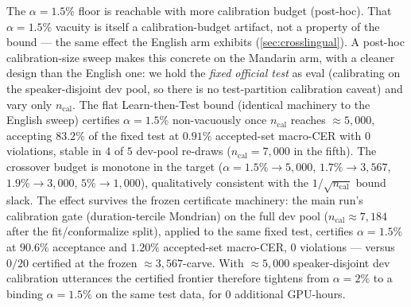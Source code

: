 \documentclass[11pt]{article}
\begin{document}
The $\alpha=1.5\%$ floor is reachable with more calibration budget (post-hoc).
That $\alpha=1.5\%$ vacuity is itself a calibration-budget artifact, not a property of
the bound --- the same effect the English arm exhibits (\cref{sec:crosslingual}). A post-hoc
calibration-size sweep makes this concrete on the Mandarin arm, with a cleaner design than the
English one: we hold the \emph{fixed official test} as eval (calibrating on the speaker-disjoint
dev pool, so there is no test-partition calibration caveat) and vary only $n_{\mathrm{cal}}$.
The flat Learn-then-Test bound (identical machinery to the English sweep) certifies
$\alpha=1.5\%$ non-vacuously once $n_{\mathrm{cal}}$ reaches $\approx5{,}000$, accepting
$83.2\%$ of the fixed test at $0.91\%$ accepted-set macro-CER with $0$ violations, stable in
$4$ of $5$ dev-pool re-draws ($n_{\mathrm{cal}}=7{,}000$ in the fifth). The crossover budget is
monotone in the target ($\alpha{=}1.5\%\!\to\!5{,}000$, $1.7\%\!\to\!3{,}567$,
$1.9\%\!\to\!3{,}000$, $5\%\!\to\!1{,}000$), qualitatively consistent with the
$1/\sqrt{n_{\mathrm{cal}}}$ bound slack. The effect survives the frozen certificate machinery: the main run's
calibration gate (duration-tercile Mondrian) on the full dev pool
($n_{\mathrm{cal}}\approx7{,}184$ after the fit/conformalize split), applied to the same fixed
test, certifies $\alpha=1.5\%$ at $90.6\%$ acceptance and $1.20\%$ accepted-set macro-CER, $0$
violations --- versus $0/20$ certified at the frozen $\approx3{,}567$-carve. With
$\approx5{,}000$ speaker-disjoint dev calibration utterances the certified frontier therefore
tightens from $\alpha=2\%$ to a binding $\alpha=1.5\%$ on the same test data, for $0$ additional
GPU-hours.
\end{document}
